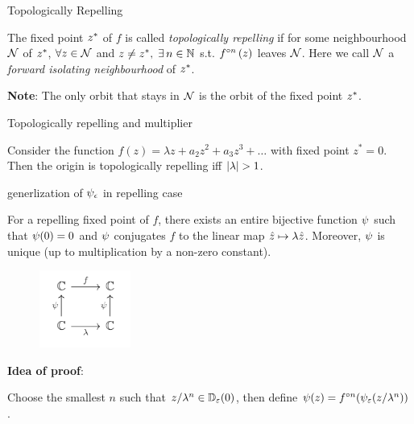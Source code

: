 \begin{frame}{Topologically Repelling}
    \begin{definition}
   
    The fixed point $z^*$ of $f$ is called \emph{topologically repelling} if for some neighbourhood $\mathcal{N}$ of $z^*$, $\forall z \in \mathcal{N} $ and $z \neq z^*,\; \exists\, n \in \mathbb{N}$ s.t. $f^{\circ n}\left(z\right)$ leaves $\mathcal{N}$.  Here we call $\mathcal{N}$ a \emph{forward isolating neighbourhood} of $z^*$.
    \end{definition}
    
    \textbf{Note}: The only orbit that stays in $\mathcal{N}$ is the orbit of the fixed point $z^*$.
\end{frame}

\begin{frame}{Topologically repelling and multiplier}
    \begin{theorem}
          Consider the function $f(z)=\lambda z+a_{2} z^{2}+a_{3} z^{3}+\dots$ with fixed point $z^*=0$. Then the origin is topologically repelling iff $\abs{\lambda}>1$.
        \end{theorem}
\end{frame}

\begin{frame}{generlization of $\psi_{\epsilon}$ in repelling case}
    \begin{thm}
    For a repelling fixed point of $f$, there exists an entire bijective function $\psi$ such that $\psi (0)=0$ and $\psi$ conjugates $f$ to the linear map $\hat{z} \mapsto \lambda\hat{z}$. Moreover, $\psi$ is unique (up to multiplication by a non-zero constant).
     \begin{figure}
    \centering
    \includegraphics[width=3cm]{resources/ch-08/graph3.png}
   
    \end{figure}
    \end{thm} 
   
   \textbf{Idea of proof}: 
   
   Choose the smallest $n$  such that $z/{\lambda ^{n}}\in\mathbb{D}_{\varepsilon}(0)$, then define $\psi(z)=f^{\circ n}(\psi_{\varepsilon} (z/{\lambda ^{n}}))$.
\end{frame}

